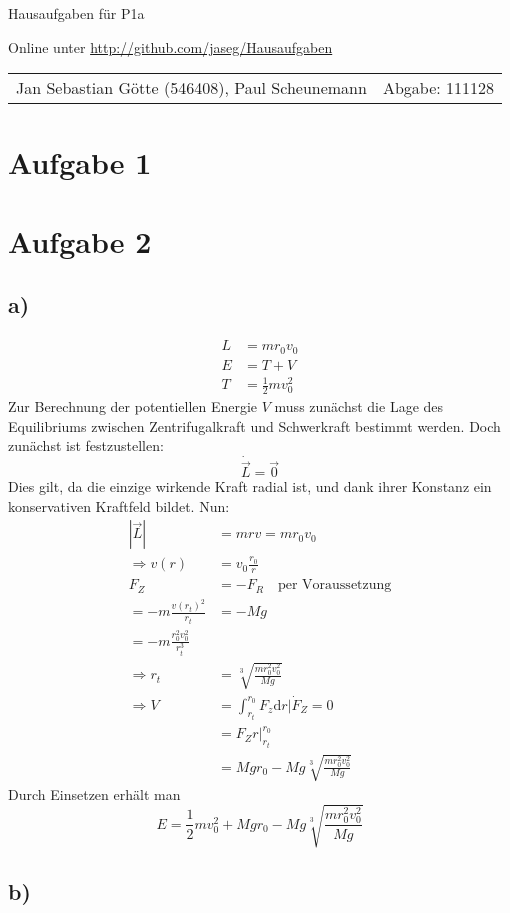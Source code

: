 \documentclass[12pt,a4paper,notitlepage]{article}
\newcommand{\diff}{\mathrm{d}}
\newcommand{\aufgabe}[1]{\section*{\setcounter{section}{#1}Aufgabe #1}}
\begin{document}
\begin{center}
\Large Hausaufgaben für P1a

\normalsize Online unter \url{http://github.com/jaseg/Hausaufgaben}
\end{center}
\begin{tabularx}{\textwidth}{Xr}
Jan Sebastian Götte (546408), Paul Scheunemann&Abgabe: 111128
\end{tabularx}
\aufgabe{1}
\aufgabe{2}
\subsection*{a)}
\begin{align}
L&=mr_0v_0\\
E&=T+V\\
T&=\frac{1}{2}mv_0^2
\end{align}
Zur Berechnung der potentiellen Energie $V$ muss zunächst die Lage des Equilibriums zwischen Zentrifugalkraft und Schwerkraft bestimmt werden. Doch zunächst ist festzustellen:
\begin{equation}
\dot{\vec L}=\vec 0
\end{equation}
Dies gilt, da die einzige wirkende Kraft radial ist, und dank ihrer Konstanz ein konservativen Kraftfeld bildet. Nun:
\begin{align}
\left|\vec L\right|&=mrv=mr_0v_0\\
\Rightarrow v(r)&=v_0\frac{r_0}{r}\\
F_Z&=-F_R\quad\text{per Voraussetzung}\\
=-m\frac{v(r_t)^2}{r_t}&=-Mg\\
=-m\frac{r_0^2v_0^2}{r_t^3}\\
\Rightarrow r_t&=\sqrt[3]{\frac{mr_0^2v_0^2}{Mg}}\\
\Rightarrow V&=\int_{r_t}^{r_0}F_z\diff r\Big|\dot F_Z=0\\
&=F_Zr\Big|_{r_t}^{r_0}\\
&=Mgr_0-Mg\sqrt[3]{\frac{mr_0^2v_0^2}{Mg}}
\end{align}
Durch Einsetzen erhält man
\begin{equation}
E=\frac{1}{2}mv_0^2+Mgr_0-Mg\sqrt[3]{\frac{mr_0^2v_0^2}{Mg}}
\end{equation}
\subsection*{b)}
\end{document}

